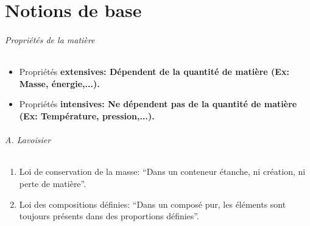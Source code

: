 

\usepackage{multirow}
\usepackage[version=3]{mhchem}
\usepackage[squaren, Gray]{SIunits}
\usepackage{color}
\usepackage{chemfig}
\usepackage{numprint}
\usepackage{appendix}
\usepackage{tikz}
\usepackage{pgfplots}
\usepackage{pgffor}

\renewcommand{\textbf}[1]{\begingroup\bfseries\mathversion{bold}#1\endgroup}

\newcommand\sorb{\mathrm{s}}
\newcommand\porb{\mathrm{p}}
\newcommand\dorb{\mathrm{d}}
\newcommand\forb{\mathrm{f}}
\newcommand\gorb{\mathrm{g}}
\newcommand\gaz{\ensuremath{_{(g)}}}
\newcommand\solid{\ensuremath{_{(s)}}}
\newcommand\liquid{\ensuremath{_{(l)}}}
\newcommand\debye{\mathrm{D}}
\newcommand\calo{\mathrm{cal}}
\newcommand\atm{\mathrm{atm}}
\newcommand\ccal{\ensuremath{C_\mathrm{cal}}}
\newcommand\qrev{\ensuremath{q_{\mathrm{rév}}}}
\newcommand\kc{\ensuremath{K_{\mathrm{c}}}}
\newcommand\kp{\ensuremath{K_{\mathrm{p}}}}
\newcommand\keq{\ensuremath{K_{\mathrm{éq}}}}
\newcommand\pkb{\mathrm{p}\ensuremath{K_b}}
\newcommand\pka{\mathrm{p}\ensuremath{K_a}}
\newcommand\ph{\ensuremath{\mathrm{pH}}}


\part{Notions de base}

\paragraph{Propriétés de la matière}
\begin{itemize}
	\item Propriétés \textbf{extensives}: Dépendent de la quantité de matière (Ex: Masse, énergie,...).
	\item Propriétés \textbf{intensives}: Ne dépendent pas de la quantité de matière (Ex: Température, pression,...).
\end{itemize}

\paragraph{A. Lavoisier}
\begin{enumerate}
	\item Loi de conservation de la masse: ``Dans un conteneur étanche, ni création, ni perte de matière''.
	\item Loi des compositions définies: ``Dans un composé pur, les éléments sont toujours présents dans des proportions définies''.
\end{enumerate}

